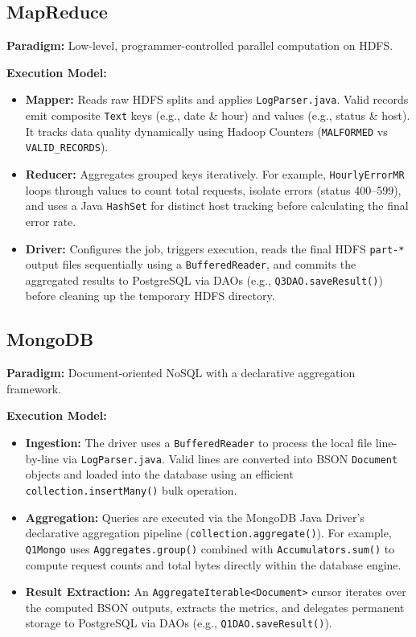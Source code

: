 \documentclass[11pt,a4paper]{article}
\begin{document}
\subsection{MapReduce}
\begin{mrbox}
\textbf{Paradigm:} Low-level, programmer-controlled parallel computation on HDFS.

\textbf{Execution Model:} 
\begin{itemize}
  \item \textbf{Mapper:} Reads raw HDFS splits and applies \texttt{LogParser.java}. Valid records emit composite \texttt{Text} keys (e.g., date \& hour) and values (e.g., status \& host). It tracks data quality dynamically using Hadoop Counters (\texttt{MALFORMED} vs \texttt{VALID\_RECORDS}).
  \item \textbf{Reducer:} Aggregates grouped keys iteratively. For example, \texttt{HourlyErrorMR} loops through values to count total requests, isolate errors (status 400--599), and uses a Java \texttt{HashSet} for distinct host tracking before calculating the final error rate.
  \item \textbf{Driver:} Configures the job, triggers execution, reads the final HDFS \texttt{part-*} output files sequentially using a \texttt{BufferedReader}, and commits the aggregated results to PostgreSQL via DAOs (e.g., \texttt{Q3DAO.saveResult()}) before cleaning up the temporary HDFS directory.
\end{itemize}
\end{mrbox}

\vspace{5pt}

\subsection{MongoDB}
\begin{mongobox}
\textbf{Paradigm:} Document-oriented NoSQL with a declarative aggregation framework.

\textbf{Execution Model:}
\begin{itemize}
  \item \textbf{Ingestion:} The driver uses a \texttt{BufferedReader} to process the local file line-by-line via \texttt{LogParser.java}. Valid lines are converted into BSON \texttt{Document} objects and loaded into the database using an efficient \texttt{collection.insertMany()} bulk operation.
  \item \textbf{Aggregation:} Queries are executed via the MongoDB Java Driver's declarative aggregation pipeline (\texttt{collection.aggregate()}). For example, \texttt{Q1Mongo} uses \texttt{Aggregates.group()} combined with \texttt{Accumulators.sum()} to compute request counts and total bytes directly within the database engine.
  \item \textbf{Result Extraction:} An \texttt{AggregateIterable<Document>} cursor iterates over the computed BSON outputs, extracts the metrics, and delegates permanent storage to PostgreSQL via DAOs (e.g., \texttt{Q1DAO.saveResult()}).
\end{itemize}
\end{mongobox}
\end{document}
